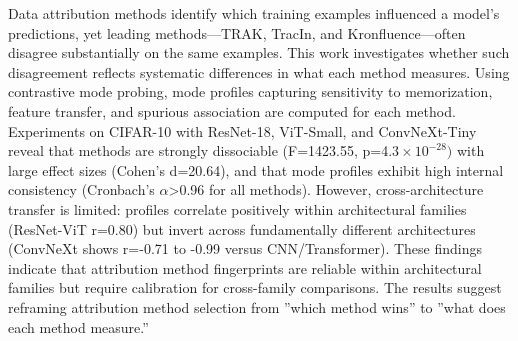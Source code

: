 
Data attribution methods identify which training examples influenced a model's predictions, yet leading methods---TRAK, TracIn, and Kronfluence---often disagree substantially on the same examples. This work investigates whether such disagreement reflects systematic differences in what each method measures. Using contrastive mode probing, mode profiles capturing sensitivity to memorization, feature transfer, and spurious association are computed for each method. Experiments on CIFAR-10 with ResNet-18, ViT-Small, and ConvNeXt-Tiny reveal that methods are strongly dissociable (F=1423.55, p=4.$3\times 10^{-28})$ with large effect sizes (Cohen's d=20.64), and that mode profiles exhibit high internal consistency (Cronbach's $\alpha$>0.96 for all methods). However, cross-architecture transfer is limited: profiles correlate positively within architectural families (ResNet-ViT r=0.80) but invert across fundamentally different architectures (ConvNeXt shows r=-0.71 to -0.99 versus CNN/Transformer). These findings indicate that attribution method fingerprints are reliable within architectural families but require calibration for cross-family comparisons. The results suggest reframing attribution method selection from ''which method wins'' to ''what does each method measure.''
